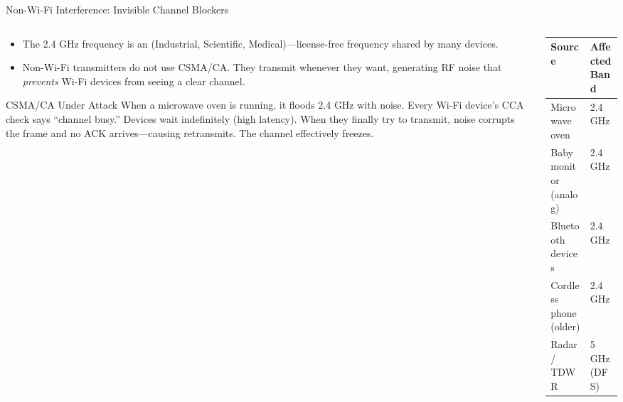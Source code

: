 \documentclass[aspectratio=169]{beamer}
\begin{document}
\begin{frame}{Non-Wi-Fi Interference: Invisible Channel Blockers}
    \begin{columns}[T]
        \begin{column}{0.52\textwidth}
            \footnotesize
            \begin{itemize}
                \item The 2.4 GHz frequency is an  (Industrial, Scientific, Medical)---license-free frequency shared by many devices.
                \item Non-Wi-Fi transmitters do not use CSMA/CA. They transmit whenever they want, generating RF noise that \emph{prevents} Wi-Fi devices from seeing a clear channel.
            \end{itemize}
            \vspace{0.2em}
            \begin{alertblock}{CSMA/CA Under Attack}
                \scriptsize
                When a microwave oven is running, it floods 2.4 GHz with noise. Every Wi-Fi device's CCA check says ``channel busy.'' Devices wait indefinitely (high latency). When they finally try to transmit, noise corrupts the frame and no ACK arrives---causing retransmits. The channel effectively freezes.
            \end{alertblock}
        \end{column}
        \begin{column}{0.44\textwidth}
            \begin{table}[]
                \renewcommand{\arraystretch}{1.3}
                \centering
                \scriptsize
                \begin{tabular}{|l|l|}
                \hline
                \rowcolor[HTML]{EFEFEF} \textbf{Source} & \textbf{Affected Band} \\ \hline
                Microwave oven & 2.4 GHz \\ \hline
                Baby monitor (analog) & 2.4 GHz \\ \hline
                Bluetooth devices & 2.4 GHz \\ \hline
                Cordless phone (older) & 2.4 GHz \\ \hline
                Radar / TDWR & 5 GHz (DFS) \\ \hline

\end{tabular}
\end{table}
\end{column}
\end{columns}
\end{frame}
\end{document}

